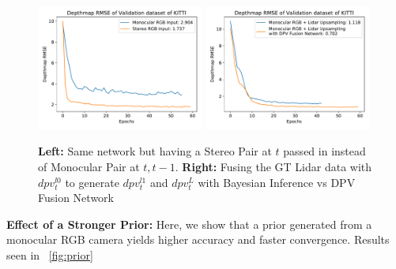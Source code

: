 \begin{figure}[H]
   \centering
   \begin{minipage}{0.5\textwidth}
       \centering
       \includegraphics[width=0.49\textwidth]{figures/Figure_6.pdf}
       \includegraphics[width=0.49\textwidth]{figures/Figure_7.pdf}
   \end{minipage}\hfill
   \centering
   \caption{ \textbf{Left:} Same network but having a Stereo Pair at $t$ passed in instead of Monocular Pair at $t, t-1$. \textbf{Right:} Fusing the GT Lidar data with $dpv_{t}^{l0}$ to generate $dpv_{t}^{l1}$ and $dpv_{t}^{L}$ with Bayesian Inference vs DPV Fusion Network}
   \label{fig:stereodpv} 
\end{figure}

\textbf{Effect of a Stronger Prior:} Here, we show that a prior generated from a monocular RGB camera yields higher accuracy and faster convergence. Results seen in ~\ref{fig:prior} 

